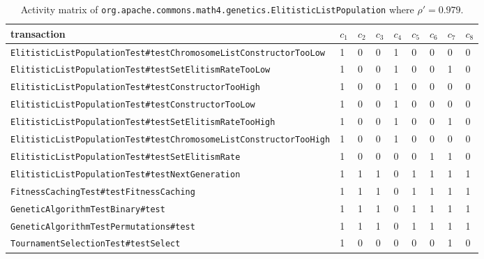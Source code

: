 \documentclass[twoside,a4paper,11pt]{memoir}
\begin{document}
\begin{table}[]
\scriptsize
\centering
\caption{Activity matrix of \texttt{org.apache.commons.math4.genetics.Elitistic\-List\-Population} where \(\rho' = 0.979\).}%
\label{tab:elitistic}
\begin{adjustbox}{center}
\begin{tabular}{l|llllllll}
transaction                                                       & \(c_1 \) & \(c_2 \) & \(c_3 \) & \(c_4 \) & \(c_5 \) & \(c_6 \) & \(c_7 \) & \(c_8 \) \\ \hline
\texttt{ElitisticListPopulationTest\#testChromosomeListConstructorTooLow}  & 1     & 0     & 0     & 1     & 0     & 0     & 0     & 0     \\
\texttt{ElitisticListPopulationTest\#testSetElitismRateTooLow}             & 1     & 0     & 0     & 1     & 0     & 0     & 1     & 0     \\
\texttt{ElitisticListPopulationTest\#testConstructorTooHigh}               & 1     & 0     & 0     & 1     & 0     & 0     & 0     & 0     \\
\texttt{ElitisticListPopulationTest\#testConstructorTooLow}                & 1     & 0     & 0     & 1     & 0     & 0     & 0     & 0     \\
\texttt{ElitisticListPopulationTest\#testSetElitismRateTooHigh}            & 1     & 0     & 0     & 1     & 0     & 0     & 1     & 0     \\
\texttt{ElitisticListPopulationTest\#testChromosomeListConstructorTooHigh} & 1     & 0     & 0     & 1     & 0     & 0     & 0     & 0     \\
\texttt{ElitisticListPopulationTest\#testSetElitismRate}                   & 1     & 0     & 0     & 0     & 0     & 1     & 1     & 0     \\
\texttt{ElitisticListPopulationTest\#testNextGeneration}                   & 1     & 1     & 1     & 0     & 1     & 1     & 1     & 1     \\
\texttt{FitnessCachingTest\#testFitnessCaching}                            & 1     & 1     & 1     & 0     & 1     & 1     & 1     & 1     \\
\texttt{GeneticAlgorithmTestBinary\#test}                                  & 1     & 1     & 1     & 0     & 1     & 1     & 1     & 1     \\
\texttt{GeneticAlgorithmTestPermutations\#test}                            & 1     & 1     & 1     & 0     & 1     & 1     & 1     & 1     \\
\texttt{TournamentSelectionTest\#testSelect}                               & 1     & 0     & 0     & 0     & 0     & 0     & 1     & 0
\end{tabular}
\end{adjustbox}
\end{table}
\end{document}
